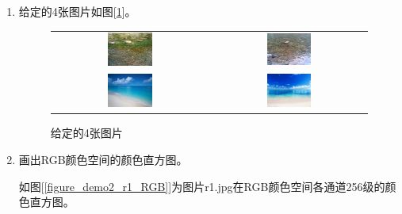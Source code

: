 \documentclass[a4paper, 12pt, UTF8]{article}
\begin{document}
\begin{enumerate}

\item 给定的4张图片如图[\ref{figure_4}]。

\begin{figure}[h!]
    \centering
    \begin{tabular}{cc}
        \includegraphics[width=0.3\textwidth]{in/r1.jpg} &
        \includegraphics[width=0.3\textwidth]{in/r2.jpg} \\
        \includegraphics[width=0.3\textwidth]{in/s1.jpg} &
        \includegraphics[width=0.3\textwidth]{in/s2.jpg}
    \end{tabular}
    \caption{给定的4张图片}
    \label{figure_4}
\end{figure}

\item 画出RGB颜色空间的颜色直方图。

如图[\ref{figure_demo2_r1_RGB}]为图片r1.jpg在RGB颜色空间各通道256级的颜色直方图。


\end{enumerate}
\end{document}
